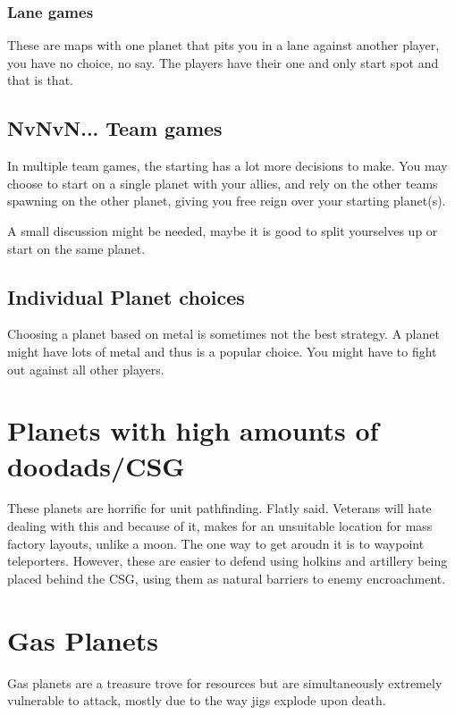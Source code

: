 \documentclass[]{article}
\begin{document}
\subsubsection{Lane games}

These are maps with one planet that pits you in a lane against another player, you have no choice, no say.  The players have their one and only start spot and that is that.  


\subsection{NvNvN... Team games}

In multiple team games, the starting has a lot more decisions to make.  You may choose to start on a single planet with your allies, and rely on the other teams spawning on the other planet, giving you free reign over your starting planet(s).  

A small discussion might be needed, maybe it is good to split yourselves up or start on the same planet.   

\subsection{Individual Planet choices}

Choosing a planet based on metal is sometimes not the best strategy.  A planet might have lots of metal and thus is a popular choice.  You might have to fight out against all other players.  



\newpage
\section{Planets with high amounts of doodads/CSG}

These planets are horrific for unit pathfinding.  Flatly said.  Veterans will hate dealing with this and because of it, makes for an unsuitable location for mass factory layouts, unlike a moon.  The one way to get aroudn it is to waypoint teleporters. However, these are easier to defend using holkins and artillery being placed behind the CSG, using them as natural barriers to enemy encroachment.  
\newpage
\section{Gas Planets}


Gas planets are a treasure trove for resources but are simultaneously extremely vulnerable to attack, mostly due to the way jigs explode upon death.  
\end{document}

